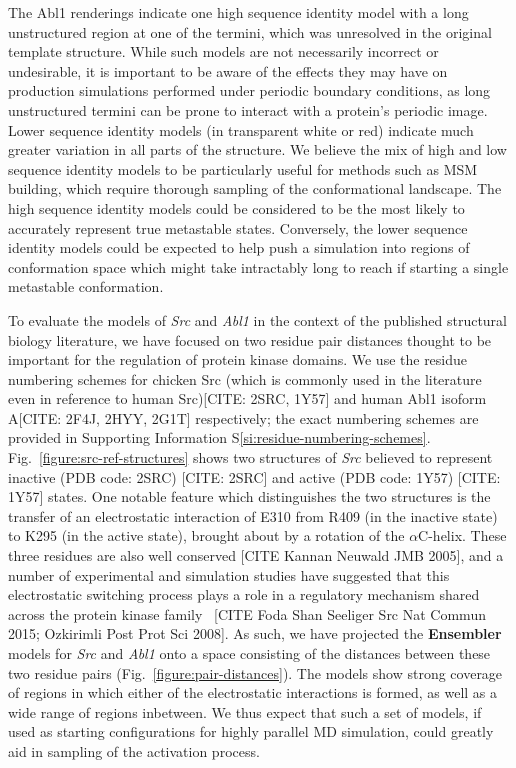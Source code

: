 \documentclass[aps,pre,twocolumn,nofootinbib,superscriptaddress,linenumbers]{revtex4-1}
\begin{document}
The Abl1 renderings indicate one high sequence identity model with a long unstructured region at one of the termini, which was unresolved in the original template structure.
While such models are not necessarily incorrect or undesirable, it is important to be aware of the effects they may have on production simulations performed under periodic boundary conditions, as long unstructured termini can be prone to interact with a protein's periodic image.
Lower sequence identity models (in transparent white or red) indicate much greater variation in all parts of the structure.
We believe the mix of high and low sequence identity models to be particularly useful for methods such as MSM building, which require thorough sampling of the conformational landscape.
The high sequence identity models could be considered to be the most likely to accurately represent true metastable states.
Conversely, the lower sequence identity models could be expected to help push a simulation into regions of conformation space which might take intractably long to reach if starting a single metastable conformation.

To evaluate the models of \emph{Src} and \emph{Abl1} in the context of the published structural biology literature, we have focused on two residue pair distances thought to be important for the regulation of protein kinase domains.
We use the residue numbering schemes for chicken Src (which is commonly used in the literature even in reference to human Src)[CITE: 2SRC, 1Y57] and human Abl1 isoform A[CITE: 2F4J, 2HYY, 2G1T] respectively; the exact numbering schemes are provided in Supporting Information S\ref{si:residue-numbering-schemes}.
Fig.~\ref{figure:src-ref-structures} shows two structures of \emph{Src} believed to represent inactive (PDB code: 2SRC) {\color{red}[CITE: 2SRC]} and active (PDB code: 1Y57) {\color{red}[CITE: 1Y57]} states.
One notable feature which distinguishes the two structures is the transfer of an electrostatic interaction of E310 from R409 (in the inactive state) to K295 (in the active state), brought about by a rotation of the $\alpha$C-helix.
These three residues are also well conserved [CITE Kannan Neuwald JMB 2005], and a number of experimental and simulation studies have suggested that this electrostatic switching process plays a role in a regulatory mechanism shared across the protein kinase family~\cite{shukla-pande:nature-commun:2014:src-activation-msm} [CITE Foda Shan Seeliger Src Nat Commun 2015; Ozkirimli Post Prot Sci 2008].
As such, we have projected the {\bf Ensembler} models for \emph{Src} and \emph{Abl1} onto a space consisting of the distances between these two residue pairs (Fig.~\ref{figure:pair-distances}).
The models show strong coverage of regions in which either of the electrostatic interactions is formed, as well as a wide range of regions inbetween.
We thus expect that such a set of models, if used as starting configurations for highly parallel MD simulation, could greatly aid in sampling of the activation process.
\end{document}
